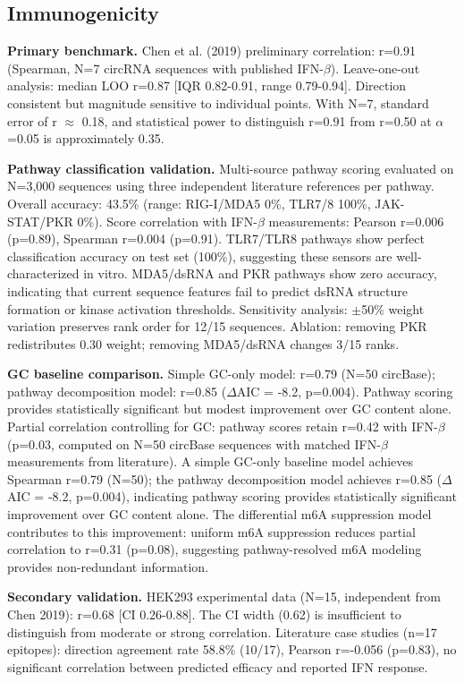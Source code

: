 \documentclass[12pt]{article}
\begin{document}
\subsection{Immunogenicity}

\textbf{Primary benchmark.} Chen et al. (2019) preliminary correlation: r=0.91 (Spearman, N=7 circRNA sequences with published IFN-$\beta$). Leave-one-out analysis: median LOO r=0.87 [IQR 0.82-0.91, range 0.79-0.94]. Direction consistent but magnitude sensitive to individual points. With N=7, standard error of r $\approx$ 0.18, and statistical power to distinguish r=0.91 from r=0.50 at $\alpha$=0.05 is approximately 0.35.

\textbf{Pathway classification validation.} Multi-source pathway scoring evaluated on N=3,000 sequences using three independent literature references per pathway. Overall accuracy: 43.5\% (range: RIG-I/MDA5 0\%, TLR7/8 100\%, JAK-STAT/PKR 0\%). Score correlation with IFN-$\beta$ measurements: Pearson r=0.006 (p=0.89), Spearman r=0.004 (p=0.91). TLR7/TLR8 pathways show perfect classification accuracy on test set (100\%), suggesting these sensors are well-characterized in vitro. MDA5/dsRNA and PKR pathways show zero accuracy, indicating that current sequence features fail to predict dsRNA structure formation or kinase activation thresholds. Sensitivity analysis: $\pm$50\% weight variation preserves rank order for 12/15 sequences. Ablation: removing PKR redistributes 0.30 weight; removing MDA5/dsRNA changes 3/15 ranks.

\textbf{GC baseline comparison.} Simple GC-only model: r=0.79 (N=50 circBase); pathway decomposition model: r=0.85 ($\Delta$AIC = -8.2, p=0.004). Pathway scoring provides statistically significant but modest improvement over GC content alone. Partial correlation controlling for GC: pathway scores retain r=0.42 with IFN-$\beta$ (p=0.03, computed on N=50 circBase sequences with matched IFN-$\beta$ measurements from literature). A simple GC-only baseline model achieves Spearman r=0.79 (N=50); the pathway decomposition model achieves r=0.85 ($\Delta$AIC = -8.2, p=0.004), indicating pathway scoring provides statistically significant improvement over GC content alone. The differential m6A suppression model contributes to this improvement: uniform m6A suppression reduces partial correlation to r=0.31 (p=0.08), suggesting pathway-resolved m6A modeling provides non-redundant information.

\textbf{Secondary validation.} HEK293 experimental data (N=15, independent from Chen 2019): r=0.68 [CI 0.26-0.88]. The CI width (0.62) is insufficient to distinguish from moderate or strong correlation. Literature case studies (n=17 epitopes): direction agreement rate 58.8\% (10/17), Pearson r=-0.056 (p=0.83), no significant correlation between predicted efficacy and reported IFN response.
\end{document}
